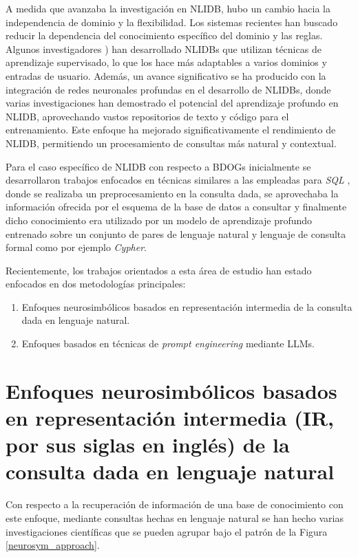 A medida que avanzaba la investigación en NLIDB, hubo un cambio hacia la independencia de dominio y la flexibilidad. Los sistemas recientes han buscado reducir la dependencia del conocimiento específico del dominio y las reglas. Algunos investigadores \cite{zhongetal2017} \cite{yuetal2018}) han desarrollado NLIDBs que utilizan técnicas de aprendizaje supervisado, lo que los hace más adaptables a varios dominios y entradas de usuario. Además, un avance significativo se ha producido con la integración de redes neuronales profundas en el desarrollo de NLIDBs, donde varias investigaciones \cite{dongandlapata2016} \cite{devlinetal2018} han demostrado el potencial del aprendizaje profundo en NLIDB, aprovechando vastos repositorios de texto y código para el entrenamiento. Este enfoque ha mejorado significativamente el rendimiento de NLIDB, permitiendo un procesamiento de consultas más natural y contextual.

Para el caso específico de NLIDB con respecto a BDOGs inicialmente se desarrollaron trabajos enfocados en técnicas similares a las empleadas para \textit{SQL} \cite{adrainbazaga2021} \cite{hainsetal2019}, donde se realizaba un preprocesamiento en la consulta dada, se aprovechaba la información ofrecida por el esquema \cite{dbschema} de la base de datos a consultar y finalmente dicho conocimiento era utilizado por un modelo de aprendizaje profundo entrenado sobre un conjunto de pares de lenguaje natural y lenguaje de consulta formal como por ejemplo \textit{Cypher}.

Recientemente, los trabajos orientados a esta área de estudio han estado enfocados en dos metodologías principales:
\begin{enumerate}
	\item Enfoques neurosimbólicos basados en representación intermedia de la consulta dada en lenguaje natural.
	\item Enfoques basados en técnicas de \textit{prompt engineering} mediante LLMs.
\end{enumerate}

\section{Enfoques neurosimbólicos basados en representación intermedia (IR, por sus siglas en inglés) de la consulta dada en lenguaje natural} \label{neurosymbolic_approach}

Con respecto a la recuperación de información de una base de conocimiento con este enfoque, mediante consultas hechas en lenguaje natural se han hecho varias investigaciones científicas que se pueden agrupar bajo el patrón de la Figura \ref{neurosym_approach}.

